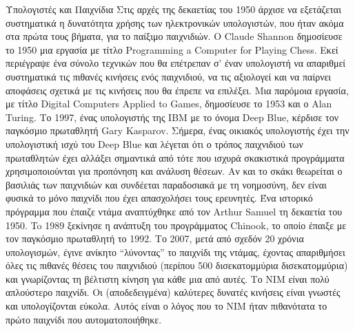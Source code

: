 \documentclass[a4paper,11pt,oneside]{book}
\begin{document}
\begin{theory}{Υπολογιστές και Παιχνίδια}
Στις αρχές της δεκαετίας του 1950 άρχισε να εξετάζεται συστηματικά η δυνατότητα χρήσης των ηλεκτρονικών υπολογιστών, που ήταν ακόμα στα πρώτα τους βήματα, για το παίξιμο παιχνιδιών.
Ο Claude Shannon %
δημοσίευσε το 1950 μια εργασία με τίτλο Programming a Computer for Playing Chess. Εκεί περιέγραψε ένα σύνολο τεχνικών που θα επέτρεπαν σ' έναν υπολογιστή να απαριθμεί συστηματικά τις πιθανές κινήσεις ενός παιχνιδιού, να τις αξιολογεί και να παίρνει αποφάσεις σχετικά με τις κινήσεις που θα έπρεπε να επιλέξει. Μια παρόμοια εργασία, με τίτλο Digital Computers Applied to Games, δημοσίευσε το 1953 και ο Alan Turing. Το 1997, ένας υπολογιστής της IBM με το όνομα Deep Blue, κέρδισε τον παγκόσμιο πρωταθλητή Gary Kasparov. Σήμερα, ένας οικιακός υπολογιστής έχει την υπολογιστική ισχύ του Deep Blue και λέγεται ότι ο τρόπος παιχνιδιού των πρωταθλητών έχει αλλάξει σημαντικά από τότε που ισχυρά σκακιστικά προγράμματα χρησιμοποιούνται για προπόνηση και ανάλυση θέσεων. Αν και το σκάκι θεωρείται ο βασιλιάς των παιχνιδιών και συνδέεται παραδοσιακά με τη νοημοσύνη, δεν είναι φυσικά το μόνο παιχνίδι που έχει απασχολήσει τους ερευνητές. Ένα ιστορικό πρόγραμμα που έπαιζε ντάμα αναπτύχθηκε από τον Arthur Samuel τη δεκαετία του 1950. To 1989 ξεκίνησε η ανάπτυξη του προγράμματος Chinook, το οποίο έπαιξε με τον παγκόσμιο πρωταθλητή το 1992. Το 2007, μετά από σχεδόν 20 χρόνια υπολογισμών, έγινε ανίκητο ``λύνοντας'' το παιχνίδι της ντάμας, έχοντας απαριθμήσει όλες τις πιθανές θέσεις του παιχνιδιού (περίπου 500 δισεκατομμύρια δισεκατομμύρια) και γνωρίζοντας τη βέλτιστη κίνηση για κάθε μια από αυτές. Το ΝΙΜ είναι πολύ απλούστερο παιχνίδι. Οι  (αποδεδειγμένα) καλύτερες δυνατές κινήσεις είναι γνωστές και υπολογίζονται εύκολα. Αυτός είναι ο λόγος που το ΝΙΜ ήταν πιθανότατα το πρώτο παιχνίδι που αυτοματοποιήθηκε.
\end{theory}
\end{document}
